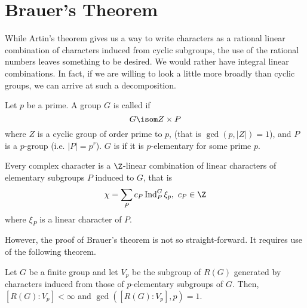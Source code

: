 \documentclass[11pt,leqno,oneside]{amsbook}
\newcommand{\Ind}{\operatorname{Ind}}
\numberwithin{thm}{section}
\begin{document}
\section{Brauer's Theorem}
While Artin's theorem gives us a way to write characters as a rational
linear combination of characters induced from cyclic subgroups, the
use of the rational numbers leaves something to be desired. We would
rather have integral linear combinations. In fact, if we are willing
to look a little more broadly than cyclic groups, we can arrive at
such a decomposition.
\begin{defn}
  Let \(p\) be a prime. A group \(G\) is called 
  if \[
    G \isom Z \times P
  \]
  where \(Z\) is a cyclic group of order prime to \(p\), (that is
  \(\gcd(p,|Z|)=1\)), and \(P\) is a \(p\)-group (i.e. \(|P| =
  p^r\)). \(G\) is  if it is \(p\)-elementary for some
  prime \(p\).
\end{defn}
\begin{thm}\label{brauers-thm}
  Every complex character is a \(\Z\)-linear combination of linear
  characters of elementary subgroups \(P\) induced to \(G\), that
  is \[
    \chi = \sum_P c_P \Ind_P^G \xi_p, \ c_P \in \Z
  \]
  where \(\xi_P\) is a linear character of \(P\).
\end{thm}
However, the proof of Brauer's theorem is not so straight-forward. It
requires use of the following theorem.
\begin{thm}
  Let \(G\) be a finite group and let \(V_p\) be the subgroup of
  \(R(G)\) generated by characters induced from those of
  \(p\)-elementary subgroups of \(G\). Then, \([R(G):V_p] < \infty\) 
  and \(\gcd([R(G):V_p],p) = 1\).
\end{thm}
\end{document}
